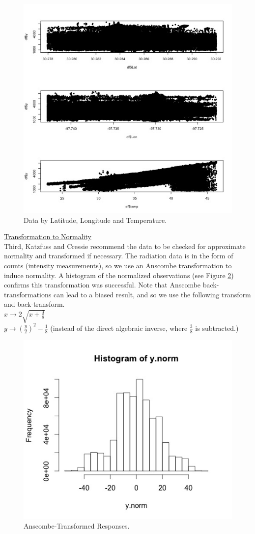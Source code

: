 \documentclass[11pt]{article}
\newcommand{\myindent}{\hspace*{1cm}}
\begin{document}
\begin{figure}[H]
\centering
\includegraphics[width=0.45\columnwidth]{Images/detrending_plots.jpg}
\caption{Data by Latitude, Longitude and Temperature.}
\label{fig:2}
\end{figure}

\underline{Transformation to Normality}\\
Third, Katzfuss and Cressie recommend the data to be checked for approximate normality and transformed if necessary.  The radiation data is in the form of counts (intensity measurements), so we use an Anscombe transformation to induce normality.  A histogram of the normalized observations (see Figure \ref{fig:3}) confirms this transformation was successful.  Note that Anscombe back-transformations can lead to a biased result, and so we use the following transform and back-transform. \\

\myindent $x \rightarrow 2\sqrt{x + \frac{3}{8}}$\\
\myindent $y \rightarrow \left(\frac{y}{2}\right)^2 - \frac{1}{8}$ 
\myindent (instead of the direct algebraic inverse, where $\frac{3}{8}$ is subtracted.)

\begin{figure}[H]
\centering
\includegraphics[width=0.5\columnwidth]{Images/histogram_ynorm}
\caption{Anscombe-Transformed Responses.}
\label{fig:3}
\end{figure}
\end{document}
